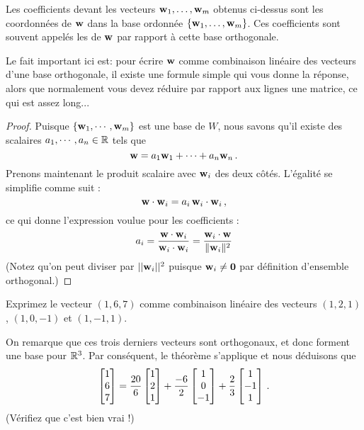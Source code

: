 Les coefficients devant les vecteurs $\mathbf{w}_1, \dots, \mathbf{w}_m$ obtenus ci-dessus sont les coordonnées de $\mathbf{w}$ dans la base ordonnée $\{\mathbf{w}_1, \dots, \mathbf{w}_m\}$. Ces coefficients sont souvent appelés les  de $\mathbf{w}$ par rapport à cette base orthogonale.

Le fait important ici est:  pour écrire $\mathbf{w}$ comme combinaison linéaire des vecteurs d'une base orthogonale, il existe une formule simple qui vous donne la réponse, alors que normalement vous devez réduire par rapport aux lignes une matrice, ce qui est assez long... 

\begin{proof}
Puisque $\{\mathbf{w}_1, \cdots, \mathbf{w}_m\}$ est une base de $W$, nous savons qu'il existe
des scalaires $a_1, \cdots, a_n\in\mathbb{R}$ tels que 
$$
\mathbf{w} = a_1\mathbf{w}_1 + \cdots + a_n\mathbf{w}_n\,.
$$
Prenons maintenant le produit scalaire avec $\mathbf{w}_i$ des deux côtés. L'égalité se simplifie comme suit :
$$
\mathbf{w} \cdot \mathbf{w}_i = a_i \,\mathbf{w}_i \cdot \mathbf{w}_i\,,
$$
ce qui donne l'expression voulue pour les coefficients :
$$
a_i = \frac{\mathbf{w} \cdot \mathbf{w}_i }{\mathbf{w}_i \cdot \mathbf{w}_i} = \frac{\mathbf{w}_i \cdot \mathbf{w} }{\Vert \mathbf{w}_i\Vert^2}
$$
(Notez qu'on peut diviser par $|| \mathbf{w}_i||^2$ puisque $\mathbf{w}_i\neq\mathbf{0}$ par définition d'ensemble orthogonal.)
\end{proof}

\begin{myprob} Exprimez le vecteur $(1,6,7)$ comme combinaison lin\'eaire des vecteurs $(1,2,1)$, $(1,0,-1)$
et $(1,-1,1)$.

\begin{mysol} On remarque que ces trois derniers vecteurs sont orthogonaux, et donc forment
une base pour $\mathbb{R}^3$.  Par conséquent, le théorème s'applique et nous déduisons que
$$
\left[ \begin{matrix} 1\\6\\7 \end{matrix} \right] = \frac{20}{6}\left[ \begin{matrix} 1\\2\\1 \end{matrix} \right] + \frac{-6}{2}\left[ \begin{matrix} 1\\0\\-1 \end{matrix} \right] + \frac{2}{3}\left[ \begin{matrix} 1\\-1\\1 \end{matrix} \right]\,.
$$
(Vérifiez que c'est bien vrai !)
\end{mysol}\end{myprob}



